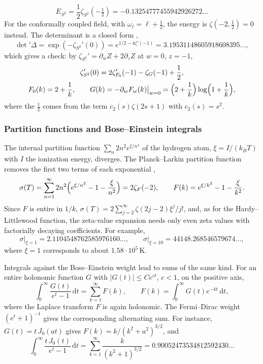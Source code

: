\documentclass[11pt,reqno]{amsart}
\theoremstyle{definition}
\theoremstyle{remark}
\newcommand{\dd}{\,\mathrm{d}}
\begin{document}
\[
  E_{S^2} = \frac12\zeta_{S^2}(-\tfrac12) = -0.13254777455942926272\ldots
\]
For the conformally coupled field, with $\omega_\ell = \ell+\frac12$, the energy is $\zeta(-2,\frac12) = 0$ instead.
The determinant is a closed form \cite{Kir02},
\[
  \det{}'\Delta = \exp(-\zeta_{S^2}'(0)) = e^{1/2-4\zeta'(-1)} = 3.19531148605918608395\ldots,
\]
which gives a check: by $\zeta_{S^2}' = \partial_wZ + 2\partial_zZ$ at $w = 0$, $z = -1$,
\begin{gather*}
  \zeta_{S^2}'(0) = 2\zeta_{F_0}'(-1) - \zeta_{G}(-1) + \frac12, \\
  F_0(k) = 2+\frac1k, \qquad G(k) = -\partial_wF_w(k)\big|_{w=0} = \Bigl(2+\frac1k\Bigr)\log\Bigl(1+\frac1k\Bigr),
\end{gather*}
where the $\frac12$ comes from the term $c_2(s)\zeta(2s+1)$ with $c_2(s) = s^2$.

\subsubsection{Partition functions and Bose--Einstein integrals} The internal partition function
$\sum_n2n^2e^{\xi/n^2}$ of the hydrogen atom, $\xi = I/(k_BT)$ with $I$ the ionization energy, diverges. The
Planck--Larkin partition function removes the first two terms of each exponential \cite{EKR11},
\[
  \sigma(T) = \sum_{n=1}^{\infty}2n^2\Bigl(e^{\xi/n^2} - 1 - \frac{\xi}{n^2}\Bigr) = 2\zeta_F(-2), \qquad
  F(k) = e^{\xi/k^2} - 1 - \frac{\xi}{k^2}.
\]
Since $F$ is entire in $1/k$, $\sigma(T) = 2\sum_{j=2}^{\infty}\zeta(2j-2)\xi^j/j!$, and, as for the Hardy--Littlewood
function, the zeta-value expansion needs only even zeta values with factorially decaying coefficients. For example,
\[
  \sigma\big|_{\xi=1} = 2.1104548762585976160\ldots, \qquad \sigma\big|_{\xi=10} = 44148.268546579674\ldots,
\]
where $\xi = 1$ corresponds to about $1.58\cdot10^5$\,K.

Integrals against the Bose--Einstein weight lead to sums of the same kind. For an entire holonomic function $G$ with
$|G(t)| \le Ce^{ct}$, $c < 1$, on the positive axis,
\[
  \int_0^\infty\frac{G(t)}{e^t-1}\dd t = \sum_{k=1}^{\infty}F(k), \qquad F(k) = \int_0^\infty G(t)e^{-kt}\dd t,
\]
where the Laplace transform $F$ is again holonomic. The Fermi--Dirac weight $(e^t+1)^{-1}$ gives the corresponding
alternating sum. For instance, $G(t) = t\,J_0(at)$ gives $F(k) = k/(k^2+a^2)^{3/2}$, and
\[
  \int_0^\infty\frac{t\,J_0(t)}{e^t-1}\dd t = \sum_{k=1}^{\infty}\frac{k}{(k^2+1)^{3/2}} = 0.90052473534812592430\ldots
\]
\end{document}
